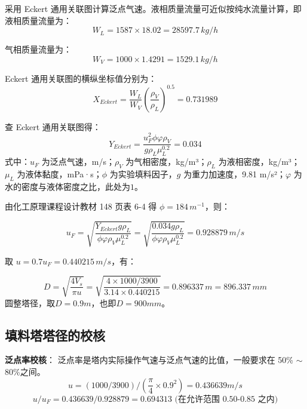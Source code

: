 采用 Eckert 通用关联图计算泛点气速。液相质量流量可近似按纯水流量计算，即液相质量流量为：
\begin{equation}
	W_{L} = 1587 \times 18.02 = 28597.7 \, kg/h
\end{equation}

气相质量流量为：
\begin{equation}
	W_{V} = 1000 \times 1.4291 = 1529.1 \, kg/h
\end{equation}

Eckert 通用关联图的横纵坐标值分别为：
\begin{equation}
	X_{Eckert} = \frac{W_{L}}{W_{V}} \left( \frac{\rho_{V}}{\rho_{L}} \right)^{0.5} = 0.731989
\end{equation}

查 Eckert 通用关联图得：
\begin{equation}
	Y_{Eckert} = \frac{u_F^2 \phi \varphi \rho_{V}}{g \rho_{L} \mu_{L}^{0.2}} = 0.034
\end{equation}
式中：$u_F$ 为泛点气速，m/s；$\rho_{V}$ 为气相密度，kg/m³；$\rho_{L}$ 为液相密度，kg/m³；$\mu_{L}$ 为液体黏度，mPa·s；$\phi$ 为实验填料因子，$g$ 为重力加速度，9.81 m/s²；$\varphi$ 为水的密度与液体密度之比，此处为$1$。

由化工原理课程设计教材 148 页表 6-4 得 $\phi = 184 \, m^{-1}$，则：

\begin{equation}
	u_F = \sqrt{\frac{Y_{Eckert} g \rho_{L}}{\phi \varphi \rho_{V} \mu_{L}^{0.2}}} = \sqrt{\frac{0.034 g \rho_{L}}{\phi \varphi \rho_{V} \mu_{L}^{0.2}}} = 0.9 28879 \, m/s
\end{equation}

取 $u = 0.7 u_F = 0.440215 \, m/s$，有：

\begin{equation}
	D = \sqrt{\frac{4V_{s}}{\pi u}} = \sqrt{\frac{4 \times 1000/3900}{3.14 \times 0.440215}} = 0.896337 \, m = 896.337 \, mm
\end{equation}
圆整塔径，取$D=0.9 m$，也即$D=900mm$。

\subsection{填料塔塔径的校核}

\textbf{泛点率校核}：
泛点率是塔内实际操作气速与泛点气速的比值，一般要求在 50\% $\sim$ 80\%之间。
\begin{equation}
	u =(1000/3900)/(\frac{\pi}{4} \times 0.9 ^2)= 0.436639 m/s
\end{equation}
\begin{equation}
	u/u_{F} = 0.436639 / 0.9 28879 = 0.694313 \text{ (在允许范围 0.50-0.85 之内)}
\end{equation}

